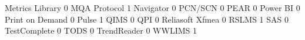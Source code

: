 \documentclass{article}
\begin{document}
\begin{Schunk}
\begin{Soutput}
  Metrics Library                                                0
  MQA Protocol                                                   1
  Navigator                                                      0
  PCN/SCN                                                        0
  PEAR                                                           0
  Power BI                                                       0
  Print on Demand                                                0
  Pulse                                                          1
  QIMS                                                           0
  QPI                                                            0
  Reliasoft Xfmea                                                0
  RSLMS                                                          1
  SAS                                                            0
  TestComplete                                                   0
  TODS                                                           0
  TrendReader                                                    0
  WWLIMS                                                         1
                                          

\end{Soutput}
\end{Schunk}
\end{document}
